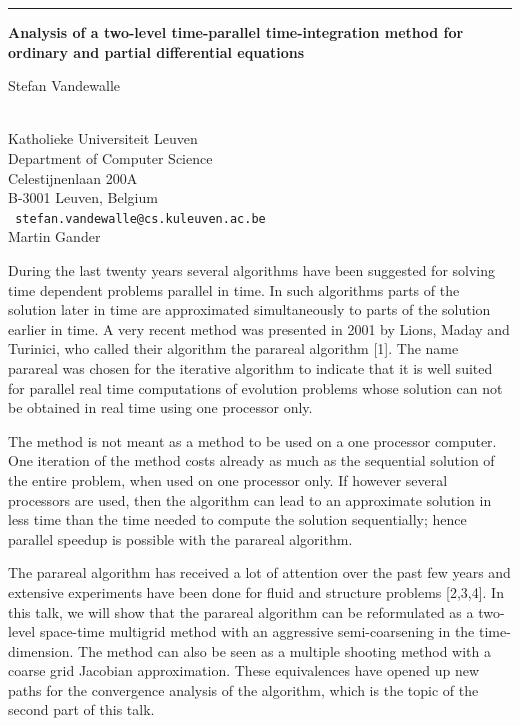 \documentclass[twosided]{report}
\begin{document}
\begin{center}

\rule{6in}{1pt}
\end{center}

\begin{center}
{\large			\label{vandewalle}
{\bf
Analysis of a two-level time-parallel time-integration method
for ordinary and partial differential equations
}

Stefan Vandewalle} \\ 
Katholieke Universiteit Leuven \\
Department of Computer Science \\
Celestijnenlaan 200A \\
B-3001 Leuven, Belgium
\\ {\tt
stefan.vandewalle@cs.kuleuven.ac.be
}
\\
Martin Gander
\end{center}

During the last twenty years several algorithms have been suggested
for solving time dependent problems parallel in time. In such
algorithms parts of the solution later in time are approximated
simultaneously to parts of the solution earlier in time. A very recent
method was presented in 2001 by Lions, Maday and Turinici, who called
their algorithm the parareal algorithm [1]. The name parareal was
chosen for the iterative algorithm to indicate that it is well suited
for parallel real time computations of evolution problems whose
solution can not be obtained in real time using one processor only.

The method is not meant as a method to be used on a one processor
computer. One iteration of the method costs already as much as the
sequential solution of the entire problem, when used on one processor
only. If however several processors are used, then the algorithm can
lead to an approximate solution in less time than the time needed to
compute the solution sequentially; hence parallel speedup is possible
with the parareal algorithm.

The parareal algorithm has received a lot of attention over the past
few years and extensive experiments have been done for fluid and
structure problems [2,3,4]. In this talk, we will show that the
parareal algorithm can be reformulated as a two-level space-time
multigrid method with an aggressive semi-coarsening in the
time-dimension. The method can also be seen as a multiple shooting
method with a coarse grid Jacobian approximation. These equivalences
have opened up new paths for the convergence analysis of the
algorithm, which is the topic of the second part of this talk.
\end{document}
